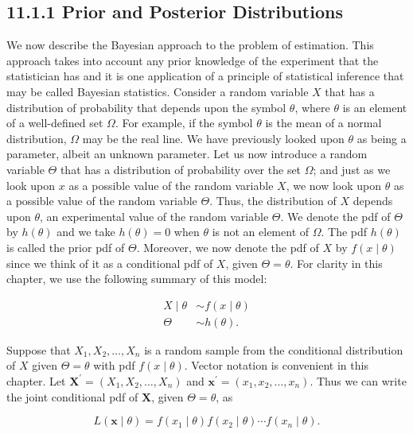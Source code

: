 \subsection*{11.1.1 Prior and Posterior Distributions}
We now describe the Bayesian approach to the problem of estimation. This approach takes into account any prior knowledge of the experiment that the statistician has and it is one application of a principle of statistical inference that may be called Bayesian statistics. Consider a random variable $X$ that has a distribution of probability that depends upon the symbol $\theta$, where $\theta$ is an element of a well-defined set $\Omega$. For example, if the symbol $\theta$ is the mean of a normal distribution, $\Omega$ may be the real line. We have previously looked upon $\theta$ as being a parameter, albeit an unknown parameter. Let us now introduce a random variable $\Theta$ that has a distribution of probability over the set $\Omega$; and just as we look upon $x$ as a possible value of the random variable $X$, we now look upon $\theta$ as a possible value of the random variable $\Theta$. Thus, the distribution of $X$ depends upon $\theta$, an experimental value of the random variable $\Theta$. We denote the pdf of $\Theta$ by $h(\theta)$ and we take $h(\theta)=0$ when $\theta$ is not an element of $\Omega$. The pdf $h(\theta)$ is called the prior pdf of $\Theta$. Moreover, we now denote the pdf of $X$ by $f(x \mid \theta)$ since we think of it as a conditional pdf of $X$, given $\Theta=\theta$. For clarity in this chapter, we use the following summary of this model:


\begin{align*}
X \mid \theta & \sim f(x \mid \theta) \\
\Theta & \sim h(\theta) . \tag{11.1.1}
\end{align*}


Suppose that $X_{1}, X_{2}, \ldots, X_{n}$ is a random sample from the conditional distribution of $X$ given $\Theta=\theta$ with pdf $f(x \mid \theta)$. Vector notation is convenient in this chapter. Let $\mathbf{X}^{\prime}=\left(X_{1}, X_{2}, \ldots, X_{n}\right)$ and $\mathbf{x}^{\prime}=\left(x_{1}, x_{2}, \ldots, x_{n}\right)$. Thus we can write the joint conditional pdf of $\mathbf{X}$, given $\Theta=\theta$, as


\begin{equation*}
L(\mathbf{x} \mid \theta)=f\left(x_{1} \mid \theta\right) f\left(x_{2} \mid \theta\right) \cdots f\left(x_{n} \mid \theta\right) . \tag{11.1.2}
\end{equation*}


